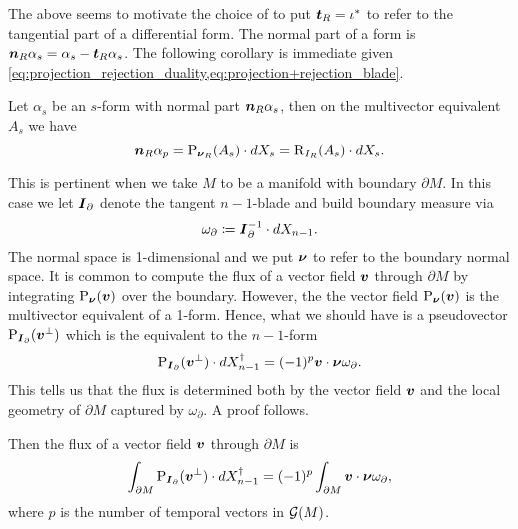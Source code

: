 The above seems to motivate the choice of \cite{schwarz_hodge_1995} to put $\boldsymbol{t}_R = \iota^*$ to refer to the tangential part of a differential form. The normal part of a form is $\boldsymbol{n}_R \alpha_s = \alpha_s - \boldsymbol{t}_R \alpha_s$. The following corollary is immediate given \cref{eq:projection_rejection_duality,eq:projection+rejection_blade}. 
\begin{corollary}
Let $\alpha_s$ be an $s$-form with normal part $\boldsymbol{n}_R \alpha_s$, then on the multivector equivalent $A_s$ we have
\begin{equation}
\boldsymbol{n}_R \alpha_p = \operatorname{P}_{\boldsymbol{\nu}_R}(A_s)\cdot dX_s = \operatorname{R}_{I_R}(A_s)\cdot dX_s.
\end{equation}
\end{corollary}

This is pertinent when we take $M$ to be a manifold with boundary $\partial M$. In this case we let $\boldsymbol{I}_\partial$ denote the tangent $n-1$-blade and build boundary measure via
\begin{equation}
\omega_\partial \coloneqq \boldsymbol{I}_\partial^{-1} \cdot dX_{n-1}.
\end{equation}
The normal space is 1-dimensional and we put $\boldsymbol{\nu}$ to refer to the boundary normal space. It is common to compute the flux of a vector field $\boldsymbol{v}$ through $\partial M$ by integrating $\operatorname{P}_{\boldsymbol{\nu}}(\boldsymbol{v})$ over the boundary. However, the the vector field $\operatorname{P}_{\boldsymbol{\nu}}(\boldsymbol{v})$ is the multivector equivalent of a 1-form. Hence, what we should have is a pseudovector $\operatorname{P}_{\boldsymbol{I}_\partial}(\boldsymbol{v}^\perp)$ which is the equivalent to the $n-1$-form
\begin{equation}
\operatorname{P}_{\boldsymbol{I}_\partial}(\boldsymbol{v}^\perp) \cdot dX_{n-1}^\dagger = (-1)^p \boldsymbol{v}\cdot \boldsymbol{\nu} \omega_\partial.
\end{equation}
This tells us that the flux is determined both by the vector field $\boldsymbol{v}$ and the local geometry of $\partial M$ captured by $\omega_\partial$. A proof follows. 
\begin{lemma}
Then the flux of a vector field $\boldsymbol{v}$ through $\partial M$ is
\begin{equation}
\int_{\partial M} \operatorname{P}_{\boldsymbol{I}_\partial}(\boldsymbol{v}^\perp) \cdot dX_{n-1}^\dagger = (-1)^p\int_{\partial M} \boldsymbol{v} \cdot \boldsymbol{\nu} \omega_\partial,
\end{equation}
where $p$ is the number of temporal vectors in $\mathcal{G}(M)$.
\end{lemma}

